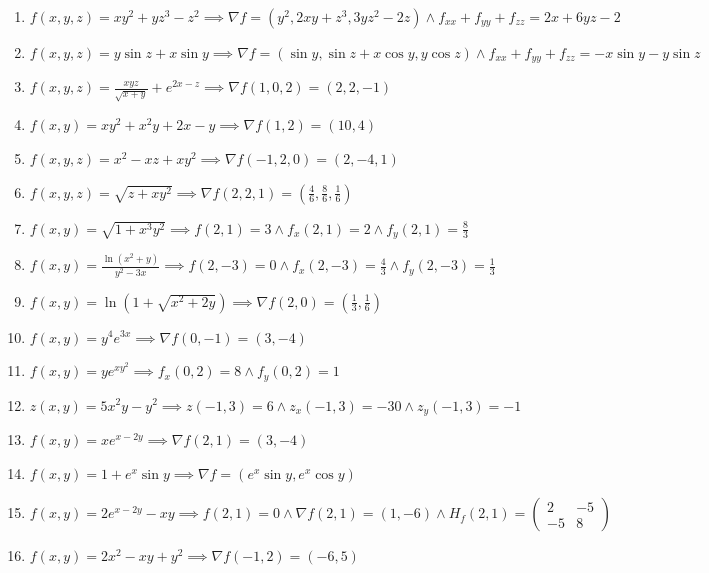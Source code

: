 \documentclass[11pt,a4paper]{article}
\begin{document}
\begin{enumerate}
\item $\displaystyle f(x, y, z) = xy^{2} + yz^{3} - z^{2} \implies \nabla f = \left( y^{2}, 2xy + z^{3}, 3yz^{2} - 2z \right) \land f_{xx} + f_{yy} + f_{zz} = 2x + 6yz - 2$
\item $\displaystyle f(x, y, z) = y \sin z + x \sin y \implies \nabla f = \left( \sin y, \sin z + x \cos y, y \cos z \right) \land f_{xx} + f_{yy} + f_{zz} = -x \sin y - y \sin z$
\item $\displaystyle f(x, y, z) = \frac{xyz}{\sqrt{x + y}} + e^{2x - z} \implies \nabla f(1, 0, 2) = (2, 2, -1)$
\item $\displaystyle f(x, y) = xy^{2} + x^{2} y + 2x - y \implies \nabla f(1, 2) = (10, 4)$
\item $\displaystyle f(x, y, z) = x^{2} - xz + xy^{2} \implies \nabla f(-1, 2, 0) = (2, -4, 1)$
\item $\displaystyle f(x, y, z) = \sqrt{z + xy^{2}} \implies \nabla f(2, 2, 1) = \left( \frac{4}{6}, \frac{8}{6}, \frac{1}{6} \right)$
\item $\displaystyle f(x, y) = \sqrt{1 + x^{3} y^{2}} \implies f(2, 1) = 3 \land f_{x}(2, 1) = 2 \land f_{y}(2, 1) = \frac{8}{3}$
\item $\displaystyle f(x, y) = \frac{\ln(x^{2} + y)}{y^{2} - 3x} \implies f(2, -3) = 0 \land f_{x}(2, -3) = \frac{4}{3} \land f_{y}(2, -3) = \frac{1}{3}$
\item $\displaystyle f(x, y) = \ln\left( 1 + \sqrt{x^{2} + 2y} \right) \implies \nabla f(2, 0) = \left( \frac{1}{3}, \frac{1}{6} \right)$
\item $\displaystyle f(x, y) = y^{4} e^{3x} \implies \nabla f(0, -1) = (3, -4)$
\item $\displaystyle f(x, y) = y e^{xy^{2}} \implies f_{x}(0, 2) = 8 \land f_{y}(0, 2) = 1$
\item $\displaystyle z(x, y) = 5x^{2} y - y^{2} \implies z(-1, 3) = 6 \land z_{x}(-1, 3) = -30 \land z_{y}(-1, 3) = -1$
\item $\displaystyle f(x, y) = x e^{x - 2y} \implies \nabla f(2, 1) = (3, -4)$
\item $\displaystyle f(x, y) = 1 + e^{x} \sin y \implies \nabla f = \left( e^{x} \sin y, e^{x} \cos y \right)$
\item $\displaystyle f(x, y) = 2e^{x - 2y} - xy \implies f(2, 1) = 0 \land \nabla f(2, 1) = (1, -6) \land H_{f}(2, 1) = \begin{pmatrix} 2 & -5 \\ -5 & 8 \end{pmatrix}$
\item $\displaystyle f(x, y) = 2x^{2} - xy + y^{2} \implies \nabla f(-1, 2) = (-6, 5)$

\end{enumerate}
\end{document}

